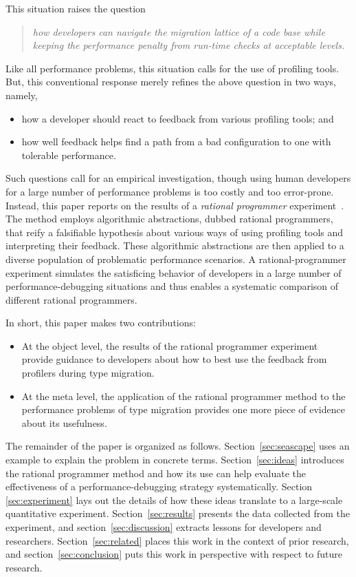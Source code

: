 This situation raises the question 
\begin{quote} \em
 how developers can navigate the migration lattice of a code base while keeping
 the performance penalty from run-time checks at acceptable levels.
\end{quote}  
Like all performance problems, this situation calls for the use of profiling
tools. But, this conventional response merely refines the above question in two
ways, namely,
\begin{itemize} \em

\item how a developer should react to feedback from various profiling tools; and 

\item how well feedback helps find a path from a bad configuration to one with
 tolerable performance.

\end{itemize}   

Such questions call for an empirical investigation, though using human
developers for a large number of performance problems is too costly and too
error-prone. Instead, this paper reports on the results of a \emph{rational
programmer} experiment~\cite{lksfd-popl-2020,lgfd-icfp-2021}. The method employs algorithmic
abstractions, dubbed rational programmers, that reify a falsifiable hypothesis
about various ways of using profiling tools and interpreting their feedback.
These algorithmic abstractions are then applied to a diverse population of
problematic performance scenarios. A rational-programmer experiment simulates the
satisficing behavior of developers in a large number of performance-debugging
situations and thus enables a systematic comparison of different rational
programmers.

In short, this paper makes two contributions:
\begin{itemize}

\item At the object level, the results of the rational programmer experiment
 provide guidance to developers about how to best use the feedback from
 profilers during type migration.

\item At the meta level, the application of the rational programmer method to
 the performance problems of type migration provides one more piece of evidence
 about its usefulness. 
    
\end{itemize}    
The remainder of the paper is organized as follows.  Section~\ref{sec:seascape}
uses an example to explain the problem in concrete terms. Section~\ref{sec:ideas}
introduces the rational programmer method and how its use can help evaluate the
effectiveness of a performance-debugging strategy systematically. Section
\ref{sec:experiment} lays out the details of how these ideas translate to a
large-scale quantitative experiment.  Section~\ref{sec:results} presents the data
collected from the experiment, and section~\ref{sec:discussion} extracts lessons
for developers and researchers.  Section~\ref{sec:related} places this work in
the context of prior research, and section~\ref{sec:conclusion} puts this work in
perspective with respect to future research.
